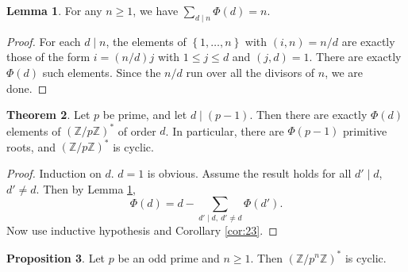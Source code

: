 \documentclass{article}
\newcommand{\Z}{\mathbb{Z}}
\newcommand{\rb}[1]{\left( #1 \right)}
\newcommand{\cb}[1]{\left\{ #1 \right\}}
\theoremstyle{definition}\newtheorem{definition}{Definition}
\theoremstyle{definition}\newtheorem*{remark}{Remark}
\theoremstyle{definition}\newtheorem*{example}{Example}
\theoremstyle{definition}\newtheorem*{note}{Note}
\newtheorem{proposition}[definition]{Proposition}
\newtheorem{lemma}[definition]{Lemma}
\newtheorem{theorem}[definition]{Theorem}
\begin{document}
\begin{lemma}
\label{lem:24}
For any $ n \ge 1 $, we have $ \sum_{d \mid n} \Phi\rb{d} = n $.
\end{lemma}

\begin{proof}
For each $ d \mid n $, the elements of $ \cb{1, \dots, n} $ with $ \rb{i, n} = n / d $ are exactly those of the form $ i = \rb{n / d}j $ with $ 1 \le j \le d $ and $ \rb{j, d} = 1 $. There are exactly $ \Phi\rb{d} $ such elements. Since the $ n / d $ run over all the divisors of $ n $, we are done.
\end{proof}

\begin{theorem}
\label{thm:26}
Let $ p $ be prime, and let $ d \mid \rb{p - 1} $. Then there are exactly $ \Phi\rb{d} $ elements of $ \rb{\Z / p\Z}^* $ of order $ d $. In particular, there are $ \Phi\rb{p - 1} $ primitive roots, and $ \rb{\Z / p\Z}^* $ is cyclic.
\end{theorem}

\begin{proof}
Induction on $ d $. $ d = 1 $ is obvious. Assume the result holds for all $ d' \mid d $, $ d' \ne d $. Then by Lemma \ref{lem:24},
$$ \Phi\rb{d} = d - \sum_{d' \mid d, \ d' \ne d} \Phi\rb{d'}. $$
Now use inductive hypothesis and Corollary \ref{cor:23}.
\end{proof}


\begin{proposition}
Let $ p $ be an odd prime and $ n \ge 1 $. Then $ \rb{\Z / p^n\Z}^* $ is cyclic.
\end{proposition}
\end{document}
